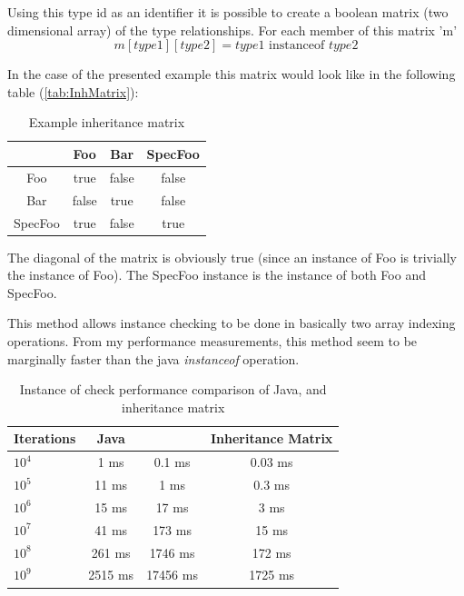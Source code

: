 Using this type id as an identifier it is possible to create a boolean matrix
(two dimensional array) of the type relationships. For each member of this matrix
'm' 
\[
m[type1][type2] = type1\textrm{ instanceof }type2
\]

In the case of the presented example this matrix would look like in the
following table (\ref{tab:InhMatrix}):

\begin{table}[ht]
	\footnotesize
	\centering
	\caption{Example inheritance matrix}\label{tab:InhMatrix}
	\begin{tabular}{| c | c | c | c |}
	\hline
			& Foo	& Bar	& SpecFoo	\\ \hline
	Foo		& true	& false	& false		\\ \hline
	Bar		& false	& true	& false		\\ \hline
	SpecFoo	& true	& false	& true		\\ \hline
	
	\hline
	\end{tabular}
	\label{tab:TabularExample}
\end{table}

The diagonal of the matrix is obviously true (since an instance of Foo is
trivially the instance of Foo). The SpecFoo instance is the instance of both Foo
and SpecFoo.

This method allows instance checking to be done in basically two array indexing
operations. From my performance measurements, this method seem to be marginally
faster than the java \emph{instanceof} operation.

\begin{table}[ht]
	\footnotesize
	\centering
	\caption{Instance of check performance comparison of Java,
	\CPP{} and inheritance matrix}\label{tab:InstPerf}
	\begin{tabular}{ | l | c | c | c |}
	\hline
	Iterations 	& Java 		& \CPP{}	&	Inheritance Matrix	\\ \hline
	$10^4$ 		&  1	ms 	& 0.1	ms	&	0.03	ms			\\
	$10^5$ 		&  11 	ms  & 1		ms	&	0.3		ms			\\
	$10^6$ 		&  15 	ms  & 17	ms	&	3		ms			\\
	$10^7$ 		&  41 	ms  & 173	ms	&	15		ms			\\
	$10^8$ 		&  261 	ms  & 1746	ms	&	172		ms			\\
	$10^9$ 		&  2515 ms  & 17456	ms	&	1725	ms			\\
	\hline
	\end{tabular}
	\label{tab:TabularExample}
\end{table}

